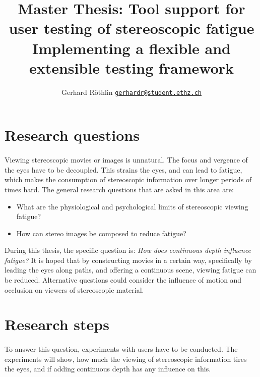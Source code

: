 \documentclass[11pt]{scrartcl}
\title{Master Thesis: Tool support for user testing of stereoscopic fatigue\\
{\large Implementing a flexible and extensible testing framework}}
\author{\normalsize Gerhard R\"othlin 
{\tt  \href{mailto:gerhardr@student.ethz.ch}{gerhardr@student.ethz.ch}}}
\date{}
\begin{document}
\maketitle



\begin{multicols}{2}


\section{Research questions}
\paragraph{}
Viewing stereoscopic movies or images is unnatural. The focus and vergence of the eyes have to be decoupled. This strains the eyes, and can lead to fatigue, which makes the consumption of stereoscopic information over longer periods of times hard. The general research questions that are asked in this area are:

\begin{itemize}
\item What are the physiological and psychological limits of stereoscopic viewing fatigue?
\item How can stereo images be composed to reduce fatigue?
\end{itemize}

During this thesis, the specific question is: {\it How does continuous depth influence fatigue?} It is hoped that by constructing movies in a certain way, specifically by leading the eyes along paths, and offering a continuous scene, viewing fatigue can be reduced. Alternative questions could consider the influence of motion and occlusion on viewers of stereoscopic material.

\section{Research steps}
\paragraph{}
To answer this question, experiments with users have to be conducted. The experiments will show, how much the viewing of stereoscopic information tires the eyes, and if adding continuous depth has any influence on this.


\end{multicols}
\end{document}
